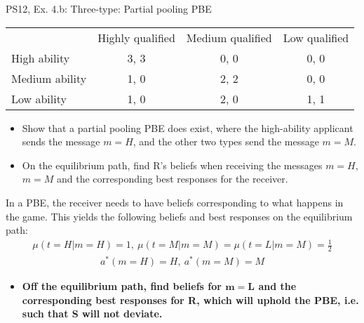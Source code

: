 \begin{frame}{PS12, Ex. 4.b: Three-type: Partial pooling PBE}
    \begin{table}
      \begin{tabular}{l|c|c|c|}
          \multicolumn{1}{c}{} & \multicolumn{1}{c}{Highly qualified} & \multicolumn{1}{c}{Medium qualified} & \multicolumn{1}{c}{Low qualified} \\\cline{2-4}
          High ability   & 3, 3 & 0, 0 & 0, 0 \\\cline{2-4}
          Medium ability & 1, 0 & 2, 2 & 0, 0 \\\cline{2-4}
          Low ability    & 1, 0 & 2, 0 & 1, 1 \\\cline{2-4}
      \end{tabular}
    \end{table}\vspace{-8pt}
    \begin{itemize}
      \item[(b)] Show that a partial pooling PBE does exist, where the high-ability applicant sends the message $m = H$, and the other two types send the message $m = M$.
      \item[Step 1:] On the equilibrium path, find R's beliefs when receiving the messages $m=H$, $m=M$ and the corresponding best responses for the receiver.
    \end{itemize}\vspace{-6pt}
    In a PBE, the receiver needs to have beliefs corresponding to what happens in the game. This yields the following beliefs and best responses on the equilibrium path:\vspace{-2pt}
    \begin{align*}
        \mu(t=H|m=H)=1,\
        \mu(t=M|m=M)=\mu(t=L|m=M)=\frac{1}{2}
    \end{align*}\vspace{-18pt}
    \begin{align*}
        a^*(m=H)=H,\ a^*(m=M)=M
    \end{align*}\vspace{-18pt}
    \begin{itemize}
      \item[Step 2:] \textbf{Off the equilibrium path, find beliefs for $\bm{m=L}$ and the corresponding best responses for R, which will uphold the PBE, i.e. such that S will not deviate.}
    \end{itemize}\vspace{-6pt}
    \vfill\null
\end{frame}
